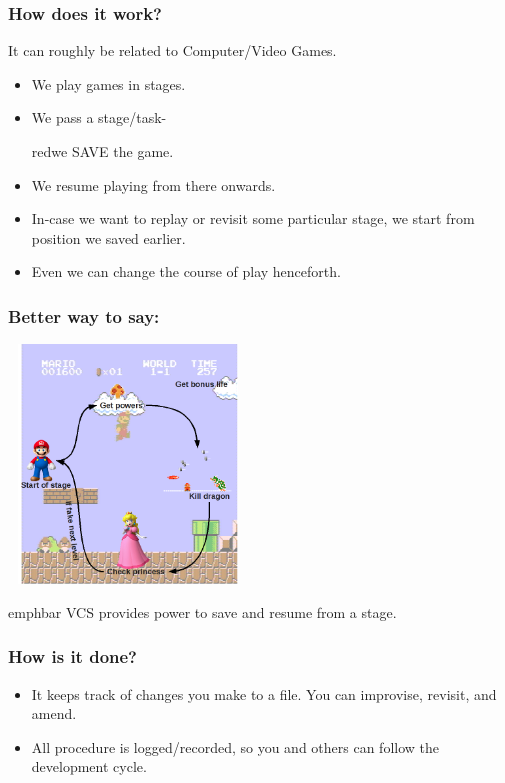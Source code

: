 \documentclass[14pt,compress]{beamer}
\newcommand{\emphbar}[1]
{\begin{beamercolorbox}[rounded=true]{emphbar} 
      {#1}
 \end{beamercolorbox}
}
\begin{document}
\begin{frame}[fragile]
  \frametitle{How does it work?}
  It can roughly be related to Computer/Video Games.
  \begin{itemize}
  \item We play games in stages.
  \item We pass a stage/task- \begin{color}{red}we SAVE the game.\end{color}
  \item We resume playing from there onwards.
  \item In-case we want to replay or revisit some particular stage, we start from position we saved earlier.
  \item Even we can change the course of play henceforth.
  \end{itemize}
\end{frame}

\begin{frame}[fragile]
  \frametitle{Better way to say:}
  \begin{center}
    \includegraphics[height=2.5in,width=2.5in, interpolate=true]{mario}
  \end{center}  
  \emphbar{VCS provides power to save and resume from a stage.}
\end{frame}

\begin{frame}
  \frametitle{How is it done?}
  \begin{itemize}
  \item It keeps track of changes you make to a file. You can improvise, revisit, and amend.
  \item All procedure is logged/recorded, so you and others can follow the development cycle.
  \end{itemize}  
\end{frame}
\end{document}
